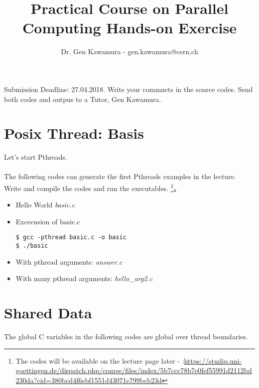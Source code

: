 \documentclass{article} \usepackage{listings}
\title{Practical Course on Parallel Computing  Hands-on Exercise}
\author{Dr. Gen Kawamura - gen.kawamura@cern.ch}
\begin{document}
\maketitle


Submission Deadline: 27.04.2018. Write your commnets in the source codes. Send both codes and outpus to a Tutor, Gen Kawamura.





\section{Posix Thread: Basis}
Let's start Pthreads.\\ 
\\
The following codes can generate the first Pthreads examples in the lecture. Write and compile the codes and run the executables.
\footnote{The codes will be available on the lecture page later - :\url{https://studip.uni-goettingen.de/dispatch.php/course/files/index/5b7ccc78b7e0fef55991d2112bd230da?cid=380bcd4f6ebf1551d43071e799bcb23d}}。\\

\begin{itemize}
\item Hello World {\it basic.c}


\item Excecusion of basic.c
\begin{lstlisting}
$ gcc -pthread basic.c -o basic 
$ ./basic
\end{lstlisting}


\item With pthread arguments: {\it answer.c}


\item With many pthread arguments: {\it hello\_arg2.c}


\end{itemize}


\section{Shared Data}
The global C variables in the following codes are global over thread boundaries.
\end{document}
